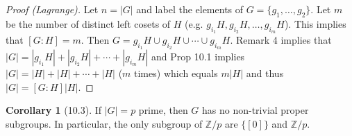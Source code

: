 \documentclass{article}
\newcommand{\Z}{\mathbb{Z}}
\newcommand{\union}{\cup}
\theoremstyle{definition}
\newtheorem*{cor}{Corollary}
\theoremstyle{remark}
\begin{document}
{{            \begin{proof}[Proof (Lagrange)]
                Let $n=|G|$ and label the elements of $G=\{g_1,\ldots,g_2\}$. Let $m$ be the number of distinct left cosets of $H$ (e.g. $g_{i_1}H,g_{i_2}H,\ldots,g_{i_m}H$). This implies that $[G:H]=m$. Then $G=g_{i_1}H\union g_{i_2}H\union \cdots\union g_{i_m}H$. Remark 4 implies that $|G|=|g_{i_1}H|+|g_{i_2}H|+\cdots+|g_{i_m}H|$ and Prop 10.1 implies $|G|=|H|+|H|+\cdots+|H|$ ($m$ times) which equals $m|H|$ and thus $|G|=[G:H]|H|$.
            \end{proof}
            
            \begin{cor}[10.3]
                If $|G|=p$ prime, then $G$ has no non-trivial proper subgroups. In particular, the only subgroup of $\Z/p$ are $\{[0]\}$ and $\Z/p$.
            \end{cor}
        
        
        }
    }
\end{document}
